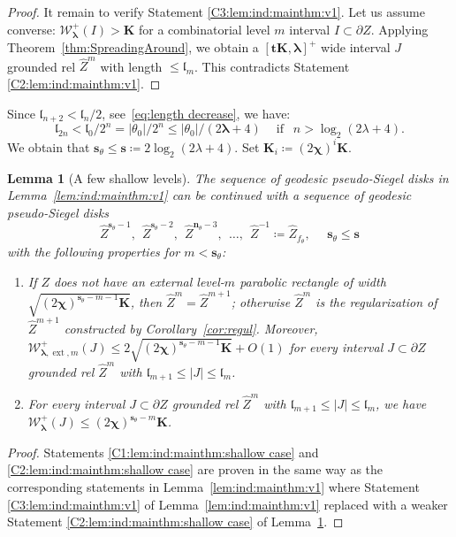 \documentclass{amsart}
\renewcommand{\sp}{{\ \ }}
\newcommand{\1}{{\mathbb 1 }}
\newcommand{\blambda}{{\boldsymbol\lambda}}
\newcommand{\ext}{{\operatorname{ext}}}
\newcommand{\Width}{{\mathcal W}}
\newcommand{\wZ}{{\widehat Z}}
\newcommand{\bK}{{\mathbf K}}
\newcommand{\bbn}{{\mathbf n}}
\newcommand{\bbs}{{\mathbf s}}
\newcommand{\bbt}{{\mathbf t}}
\newcommand{\length}{{\mathfrak l}}
\newtheorem{lem}[thm]{Lemma}
\theoremstyle{remark}
\numberwithin{equation}{section}
\theoremstyle{definition}
\newcommand{\bchi}{{\boldsymbol{ \chi}}}
\begin{document}
\begin{proof}
It remain to verify Statement \ref{C3:lem:ind:mainthm:v1}. Let us assume converse: $\Width^+_{\blambda}(I)> \bK$ for a combinatorial level $m$ interval $I\subset\partial Z$. Applying Theorem~\ref{thm:SpreadingAround}, we obtain a $[\bbt \bK,\blambda]^+$ wide interval $J$ grounded rel $\wZ^{m}$ with length $\le \length_{m}$. This contradicts Statement \ref{C2:lem:ind:mainthm:v1}.
\end{proof}


Since $\length_{n+2} < \length_n/2$, see~\eqref{eq:length decrease}, we have:\[\length_{2n}< \length_0 /2^n=|\theta_0|/2^n \le |\theta_0|/(2\blambda +4) \sp\sp\text{ if }\sp n >  \log_2 (2\lambda +4).\]
We obtain that $\bbs_\theta \le \bbs\coloneqq 2 \log_2 (2\lambda +4)$. Set $\bK_i\coloneqq (2\bchi)^i \bK$.


\begin{lem}[A few shallow levels]
\label{lem:ind:mainthm:shallow case}
The sequence of geodesic pseudo-Siegel disks in Lemma~\ref{lem:ind:mainthm:v1} can be continued with a sequence of geodesic pseudo-Siegel disks 
\[  \wZ^{\bbs_\theta-1},\sp \wZ^{\bbs_\theta-2}, \sp\wZ^{\bbn_\theta-3},\sp \dots, \sp \wZ^{-1} \coloneqq \wZ_{f_\theta},\sp\sp\sp \bbs_\theta\le \bbs\] 
with the following properties for $m<\bbs_\theta$:
\begin{enumerate}[label=\text{(\Alph*)},font=\normalfont,leftmargin=*]
\item \label{C1:lem:ind:mainthm:shallow case}
 If $Z$ does not have an external level-$m$ parabolic rectangle of width $\sqrt{(2\bchi)^{\bbs_{\theta}-m-1} \bK}$, then $\wZ^m=\wZ^{m+1}$; otherwise $\wZ^m$ is the regularization of $\wZ^{m+1}$ constructed by Corollary~\ref{cor:regul}.  Moreover, $\Width^+_{\blambda,\ext, m}(J)\le 2\sqrt { (2\bchi)^{\bbs_{\theta}-m-1}\bK}+O(1)$ for every interval $J\subset \partial Z$ grounded rel $\wZ^{m}$ with  $\length_{m+1}\le |J| \le \length_m$.

\item \label{C2:lem:ind:mainthm:shallow case} For every interval $J\subset \partial Z$ grounded rel $\wZ^{m}$ with  $\length_{m+1}\le |J| \le \length_m$, we have $\Width^+_{\blambda}(J)\le (2\bchi)^{\bbs_{\theta}-m} \bK$.
\end{enumerate}
\end{lem}
\begin{proof}
Statements \ref{C1:lem:ind:mainthm:shallow case} and \ref{C2:lem:ind:mainthm:shallow case} are proven in the same way as the corresponding statements in Lemma~\ref{lem:ind:mainthm:v1} where Statement \ref{C3:lem:ind:mainthm:v1} of Lemma~\ref{lem:ind:mainthm:v1} replaced with a weaker Statement \ref{C2:lem:ind:mainthm:shallow case} of Lemma~\ref{lem:ind:mainthm:shallow case}.
\end{proof}
 
\end{document}
